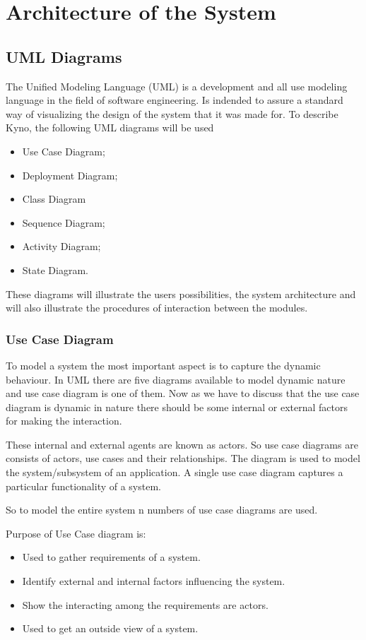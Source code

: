 \section{Architecture of the System}
\subsection{UML Diagrams}
The Unified Modeling Language (UML)\cite{uml} is a development and all use modeling language in the field of software engineering. Is indended to assure a standard way of visualizing the design of the system that it was made for.
To describe Kyno, the following UML diagrams will be used
\begin{itemize}
\item Use Case Diagram;
\item Deployment Diagram;
\item Class Diagram
\item Sequence Diagram;
\item Activity Diagram;
\item State Diagram.

\end{itemize}
These diagrams will illustrate the users possibilities, the system architecture and will also illustrate the procedures of interaction between the modules.

\subsubsection{Use Case Diagram}
To model a system the most important aspect is to capture the dynamic behaviour. In UML there are five diagrams available to model dynamic nature and use case diagram is one of them. Now as we have to discuss that the use case diagram is dynamic in nature there should be some internal or external factors for making the interaction.

These internal and external agents are known as actors. So use case diagrams are consists of actors, use cases and their relationships. The diagram is used to model the system/subsystem of an application. A single use case diagram captures a particular functionality of a system.

So to model the entire system n numbers of use case diagrams are used.

Purpose of Use Case diagram is:

\begin{itemize}
\item Used to gather requirements of a system.
\item Identify external and internal factors influencing the system.
\item Show the interacting among the requirements are actors.
\item Used to get an outside view of a system.

\end{itemize}




